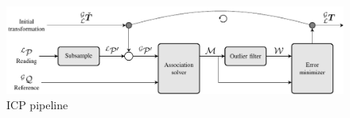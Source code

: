
\begin{figure} [htpb]
	\centering
	\includegraphics[width=\linewidth]{figs/icp_pipeline/icp_pipeline.pdf}
	\caption{ICP pipeline}
	\label{fig:icp_pipeline}
\end{figure}


